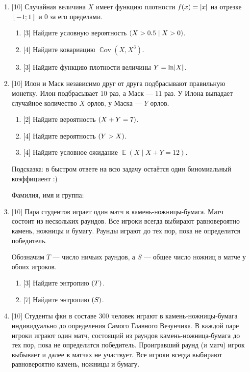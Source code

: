 \documentclass[12pt]{article}
\DeclareMathOperator{\Cov}{\mathbb{C}ov}
\let\P\relax
\DeclareMathOperator{\P}{\mathbb{P}}
\let\H\relax
\DeclareMathOperator{\H}{\mathbb{H}}
\DeclareMathOperator{\E}{\mathbb{E}}
\DeclarePairedDelimiter{\abs}{\lvert}{\rvert}
\begin{document}
\begin{enumerate}
    \item {[10]} Случайная величина $X$ имеет функцию плотности $f(x) = \abs{x}$ на отрезке $[-1;1]$ и $0$ за его пределами.
    \begin{enumerate}
        \item {[3]} Найдите условную вероятность $\P(X > 0.5 \mid X > 0)$.
        \item {[4]} Найдите ковариацию $\Cov(X, X^3)$.
        \item {[3]} Найдите функцию плотности величины $Y = \ln \abs{X}$.
    \end{enumerate}

    \item {[10]} Илон и Маск независимо друг от друга подбрасывают правильную монетку.
    Илон подбрасывает $10$ раз, а Маск — $11$ раз. 
    У Илона выпадает случайное количество $X$ орлов, у Маска — $Y$ орлов. 

    \begin{enumerate}
        \item {[2]} Найдите вероятность $\P(X + Y = 7)$.
        \item {[4]} Найдите вероятность $\P(Y > X)$.
        \item {[4]} Найдите условное ожидание $\E(X \mid X + Y = 12)$.
    \end{enumerate}

    Подсказка: в быстром ответе на всю задачу остаётся один биномиальный коэффициент :)


    \vspace{10pt}
    Фамилия, имя и группа: \dotfill

    \newpage

    \item {[10]} Пара студентов играет один матч в камень-ножницы-бумага.
    Матч состоит из нескольких раундов.
    Все игроки всегда выбирают равновероятно камень, ножницы и бумагу. 
    Раунды играют до тех пор, пока не определится победитель. 

    Обозначим $T$ — число ничьих раундов, а $S$ — общее число ножниц в матче у обоих игроков. 
    \begin{enumerate}
        \item {[3]} Найдите энтропию $\H(T)$.
        \item {[7]} Найдите энтропию $\H(S)$.
    \end{enumerate}


    \item {[10]} Студенты фкн в составе 300 человек играют в камень-ножницы-бумага индивидуально до определения Самого Главного Везунчика.
    В каждой паре игроки играют один матч, состоящий из раундов камень-ножница-бумага до тех пор, пока не определится победитель.
    Проигравший раунд (и матч) игрок выбывает и далее в матчах не участвует. 
    Все игроки всегда выбирают равновероятно камень, ножницы и бумагу. 


\end{enumerate}
\end{document}
